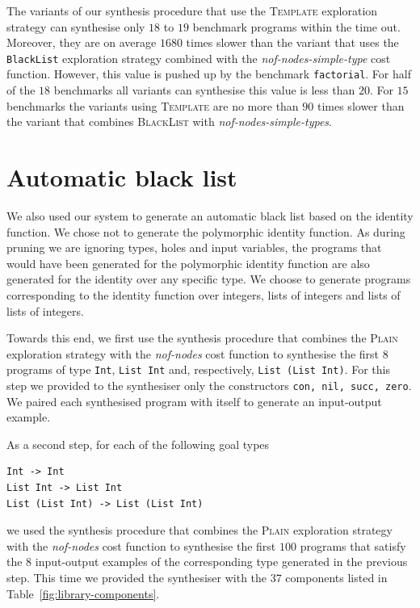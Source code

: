 The variants of our synthesis procedure that use the \textsc{Template} exploration strategy can synthesise only $18$ to $19$ benchmark programs within the time out. Moreover, they are on average $1680$ times slower than the variant that uses the \lstinline?BlackList? exploration strategy combined with the \textit{nof-nodes-simple-type} cost function. However, this value is pushed up by the benchmark \lstinline?factorial?. For half of the $18$ benchmarks all variants can synthesise this value is less than $20$. For $15$ benchmarks the variants using \textsc{Template} are no more than $90$ times slower than the variant that combines \textsc{BlackList} with \textit{nof-nodes-simple-types}.


\section{Automatic black list}\label{Black list generation}
We also used our system to generate an automatic black list based on the identity function. We chose not to generate the polymorphic identity function. As during pruning we are ignoring types, holes and input variables, the programs that would have been generated for the polymorphic identity function are also generated for the identity over any specific type. We choose to generate programs corresponding to the identity function over integers, lists of integers and lists of lists of integers.

Towards this end, we first use the synthesis procedure that combines the \textsc{Plain} exploration strategy with the \textit{nof-nodes} cost function to synthesise the first $8$ programs of type \lstinline?Int?, \lstinline?List Int? and, respectively, \lstinline?List (List Int)?. For this step we provided to the synthesiser only the constructors \lstinline?con, nil, succ, zero?. We paired each synthesised program with itself to generate an input-output example.

As a second step, for each of the following goal types
\begin{lstlisting}[style=plain]
Int -> Int
List Int -> List Int
List (List Int) -> List (List Int)
\end{lstlisting}
we used the synthesis procedure that combines the \textsc{Plain} exploration strategy with the \textit{nof-nodes} cost function to synthesise the first $100$ programs that satisfy the $8$ input-output examples of the corresponding type generated in the previous step. This time we provided the synthesiser with the $37$ components listed in Table~\ref{fig:library-components}.

